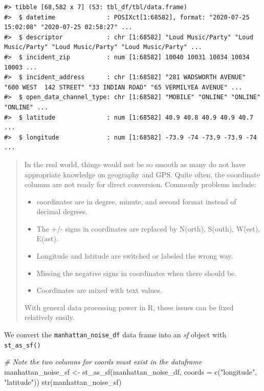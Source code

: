 \documentclass[
  11pt,
]{book}
\newenvironment{Shaded}{\begin{snugshade}}{\end{snugshade}}
\newcommand{\AttributeTok}[1]{\textcolor[rgb]{0.77,0.63,0.00}{#1}}
\newcommand{\CommentTok}[1]{\textcolor[rgb]{0.56,0.35,0.01}{\textit{#1}}}
\newcommand{\FunctionTok}[1]{\textcolor[rgb]{0.00,0.00,0.00}{#1}}
\newcommand{\NormalTok}[1]{#1}
\newcommand{\OtherTok}[1]{\textcolor[rgb]{0.56,0.35,0.01}{#1}}
\newcommand{\StringTok}[1]{\textcolor[rgb]{0.31,0.60,0.02}{#1}}
\providecommand{\tightlist}{%
  \setlength{\itemsep}{0pt}\setlength{\parskip}{0pt}}
\begin{document}
\begin{verbatim}
#> tibble [68,582 x 7] (S3: tbl_df/tbl/data.frame)
#>  $ datetime              : POSIXct[1:68582], format: "2020-07-25 15:02:08" "2020-07-25 02:58:27" ...
#>  $ descriptor            : chr [1:68582] "Loud Music/Party" "Loud Music/Party" "Loud Music/Party" "Loud Music/Party" ...
#>  $ incident_zip          : num [1:68582] 10040 10031 10034 10034 10003 ...
#>  $ incident_address      : chr [1:68582] "281 WADSWORTH AVENUE" "600 WEST  142 STREET" "33 INDIAN ROAD" "65 VERMILYEA AVENUE" ...
#>  $ open_data_channel_type: chr [1:68582] "MOBILE" "ONLINE" "ONLINE" "ONLINE" ...
#>  $ latitude              : num [1:68582] 40.9 40.8 40.9 40.9 40.7 ...
#>  $ longitude             : num [1:68582] -73.9 -74 -73.9 -73.9 -74 ...
\end{verbatim}

\begin{quote}
In the real world, things would not be so smooth as many do not have appropriate knowledge on geography and GPS. Quite often, the coordinate columns are not ready for direct conversion. Commonly problems include:

\begin{itemize}
\tightlist
\item
  coordinates are in degree, minute, and second format instead of decimal degrees.
\item
  The +/- signs in coordinates are replaced by N(orth), S(outh), W(est), E(ast).
\item
  Longitude and latitude are switched or labeled the wrong way.
\item
  Missing the negative signs in coordinates when there should be.
\item
  Coordinates are mixed with text values.
\end{itemize}

With general data processing power in R, these issues can be fixed relatively easily.
\end{quote}

We convert the \texttt{manhattan\_noise\_df} data frame into an \emph{sf} object with \texttt{st\_as\_sf()}

\begin{Shaded}
\begin{Highlighting}[]
\CommentTok{\# Note the two columns for coords must exist in the dataframe}
\NormalTok{manhattan\_noise\_sf }\OtherTok{\textless{}{-}} \FunctionTok{st\_as\_sf}\NormalTok{(manhattan\_noise\_df, }
                               \AttributeTok{coords =} \FunctionTok{c}\NormalTok{(}\StringTok{"longitude"}\NormalTok{, }\StringTok{"latitude"}\NormalTok{))}
\FunctionTok{str}\NormalTok{(manhattan\_noise\_sf)}
\end{Highlighting}
\end{Shaded}
\end{document}
